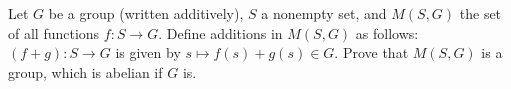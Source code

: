 Let $G$ be a group (written additively), $S$ a nonempty set, and
$M (S,G)$ the set of all functions $f : S\to G$. Define additions in
$M (S, G)$ as follows: $(f + g) : S\to G$ is given by $s\mapsto f(s)+g(s)\in
G$. Prove that $M(S, G)$ is a group, which is abelian if $G$ is.